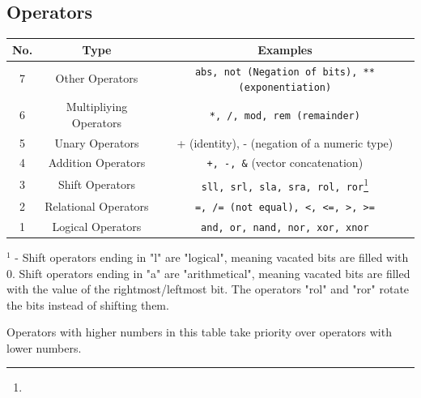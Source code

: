 \documentclass{report}
\newcommand*{\newpar}{\par\vspace{\baselineskip}\noindent} %
\begin{document}
\subsection{Operators}
\newpar
\begin{tabular}{|c|c|c|}
\hline
    No. & Type & Examples\\\hline
    7 & Other Operators & \texttt{abs, not \textrm{(Negation of bits)}, ** \textrm{(exponentiation)}}\\\hline
    6 & Multipliying Operators & \texttt{*, /, mod, rem  \textrm{(remainder)}}\\\hline
    5 & Unary Operators & + (identity), - (negation of a numeric type)\\\hline
    4 & Addition Operators & \texttt{+, -, \&} (vector concatenation)\\\hline
    3 & Shift Operators &\texttt{sll, srl, sla, sra, rol, ror}\footnote[1]{}\\\hline
    2 & Relational Operators & \texttt{=, /= \textrm{(not equal)}, <, <=, >, >=}\\\hline
    1 & Logical Operators &\texttt{and, or, nand, nor, xor, xnor}\\\hline
\end{tabular}
\newpar
$^1$ - Shift operators ending in "l" are "logical", meaning vacated bits are filled with 0. Shift operators ending in "a" are "arithmetical", meaning vacated bits are filled with the value of the rightmost/leftmost bit. The operators "rol" and "ror" rotate the bits instead of shifting them.
\newpar
Operators with higher numbers in this table take priority over operators with lower numbers.
\end{document}
